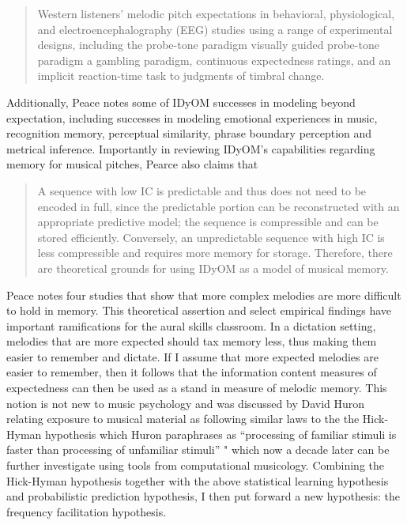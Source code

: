 \documentclass[]{book}
\begin{document}
\begin{quote}
Western listeners' melodic pitch expectations in behavioral,
physiological, and electroencephalography (EEG) studies using a range of experimental designs, including the probe-tone paradigm visually guided probe-tone paradigm a gambling paradigm, continuous expectedness ratings, and an implicit reaction-time task to judgments of timbral change.
\end{quote}

Additionally, Peace notes some of IDyOM successes in modeling beyond expectation, including successes in modeling emotional experiences in music, recognition memory, perceptual similarity, phrase boundary perception and metrical inference.
Importantly in reviewing IDyOM's capabilities regarding memory for musical pitches, Pearce also claims that

\begin{quote}
A sequence with low IC is predictable and thus does not need to be encoded in full, since the predictable portion can be reconstructed with an appropriate predictive model; the sequence is compressible and can be stored efficiently. Conversely, an unpredictable sequence with high IC is less compressible and requires more memory for storage. Therefore, there are theoretical grounds for using IDyOM as a model of musical memory.
\end{quote}

Peace notes four studies \citep{bartlettRecognitionTransposedMelodies1980, cohenRecognitionTransposedTone1977, cuddyMusicalPatternRecognition1981, halpernAgingExperienceRecognition1995} that show that more complex melodies are more difficult to hold in memory.
This theoretical assertion and select empirical findings have important ramifications for the aural skills classroom.
In a dictation setting, melodies that are more expected should tax memory less, thus making them easier to remember and dictate.
If I assume that more expected melodies are easier to remember, then it follows that the information content measures of expectedness can then be used as a stand in measure of melodic memory.
This notion is not new to music psychology and was discussed by David Huron relating exposure to musical material as following similar laws to the the Hick-Hyman hypothesis \citep{hickRateGainInformation1952, hymanStimulusInformationDeterminant1953} which Huron paraphrases as ``processing of familiar stimuli is faster than processing of unfamiliar stimuli'' \citep[pp.~63]{huronSweetAnticipation2006}" which now a decade later can be further investigate using tools from computational musicology.
Combining the Hick-Hyman hypothesis together with the above statistical learning hypothesis and probabilistic prediction hypothesis, I then put forward a new hypothesis: the frequency facilitation hypothesis.
\end{document}
